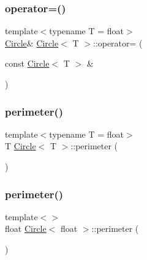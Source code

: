 \mbox{\label{classCircle_a0e3ef62951a8fccaf0635ea21ae73eca}} 
\subsubsection{\texorpdfstring{operator=()}{operator=()}\hspace{0.1cm}{\footnotesize\ttfamily [2/2]}}
{\footnotesize\ttfamily template$<$typename T  = float$>$ \\
\mbox{\hyperlink{classCircle}{Circle}}\& \mbox{\hyperlink{classCircle}{Circle}}$<$ T $>$\+::operator= (\begin{DoxyParamCaption}\item[{const \mbox{\hyperlink{classCircle}{Circle}}$<$ T $>$ \&}]{ }\end{DoxyParamCaption})\hspace{0.3cm}{\ttfamily [default]}}

\mbox{\label{classCircle_a6f066fc39c0de339b0498b04a56be028}} 
\subsubsection{\texorpdfstring{perimeter()}{perimeter()}\hspace{0.1cm}{\footnotesize\ttfamily [1/2]}}
{\footnotesize\ttfamily template$<$typename T  = float$>$ \\
T \mbox{\hyperlink{classCircle}{Circle}}$<$ T $>$\+::perimeter (\begin{DoxyParamCaption}{ }\end{DoxyParamCaption})}

\mbox{\label{classCircle_aa6c86a4a5d3ee7eb598879ba856430d9}} 
\subsubsection{\texorpdfstring{perimeter()}{perimeter()}\hspace{0.1cm}{\footnotesize\ttfamily [2/2]}}
{\footnotesize\ttfamily template$<$$>$ \\
float \mbox{\hyperlink{classCircle}{Circle}}$<$ float $>$\+::perimeter (\begin{DoxyParamCaption}{ }\end{DoxyParamCaption})\hspace{0.3cm}{\ttfamily [inline]}}



